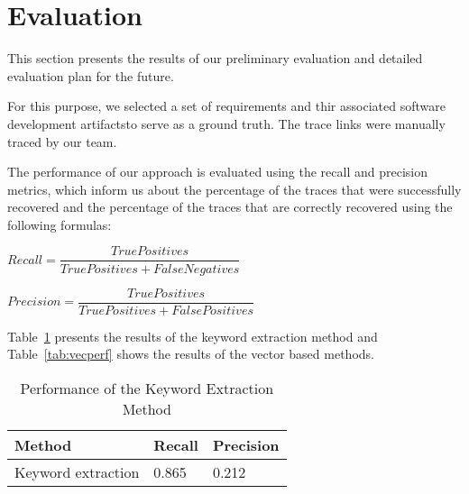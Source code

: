 \section{Evaluation}
\label{sec:eval}



This section presents the results of our preliminary evaluation and detailed evaluation plan for the future.

For this purpose, we selected a set of requirements and thir associated software development artifactsto serve as a ground truth.
The trace links were manually traced  by our team.

The performance of our approach is evaluated using the recall and precision metrics, which inform us about the  percentage of the  traces that were successfully recovered and  the percentage of the traces that are correctly recovered using the following formulas:


$Recall = \dfrac{True Positives}{True Positives + False Negatives}$


$Precision = \dfrac{True Positives}{True Positives + False Positives}$


Table~\ref{tab:keyperf} presents the results of the keyword extraction method and
  Table~\ref{tab:vecperf} shows the results of the vector based methods.


\begin{table}[htb]
\centering
\caption{\label{tab:keyperf}Performance of the Keyword Extraction Method}
\begin{tabular}{lll}
  \toprule
  Method & Recall & Precision\\
  \midrule

Keyword extraction & {0.865} & 0.212 \\
\bottomrule
\end{tabular}
\end{table}

